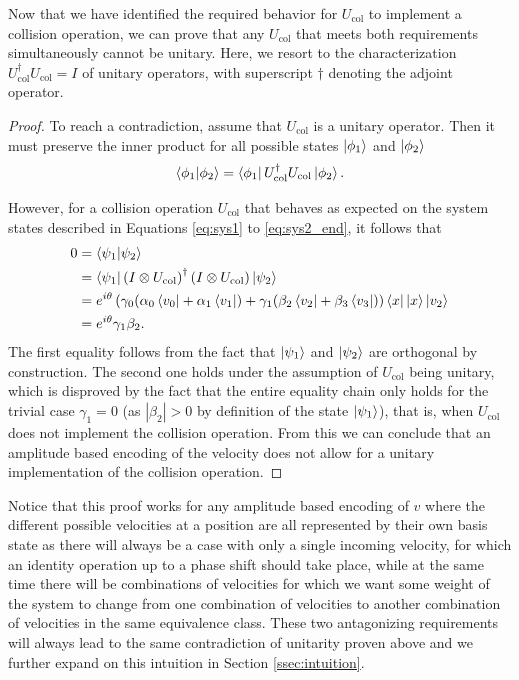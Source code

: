 Now that we have identified the required behavior for $U_\text{col}$ to implement a collision operation, we can prove that any $U_\text{col}$ that meets both requirements simultaneously cannot be unitary. Here, we resort to the characterization $U_\text{col}^\dagger U_\text{col}=I$ of unitary operators, with superscript $\dagger$ denoting the adjoint operator.

\begin{proof}
To reach a contradiction, assume that $U_\text{col}$ is a unitary operator. Then it must preserve the inner product for all possible states $\ket{\phi_1}$ and $\ket{\phi_2}$
\begin{equation}
    \braket{\phi_1 | \phi_2} = \bra{\phi_1} U_\text{col}^\dagger U_\text{col} \ket{\phi_2}.
\end{equation}

However, for a collision operation $U_\text{col}$ that behaves as expected on the system states described in Equations \eqref{eq:sys1} to \eqref{eq:sys2_end}, it follows that
\begin{equation}
\begin{split}
0 &=\braket{\psi_1|\psi_2} \\ & = \bra{\psi_1} \left ( I \otimes U_\text{col} \right )^\dagger \left ( I \otimes U_\text{col} \right ) \ket{\psi_2} \\ & = e^{i\theta}\left ( \gamma_0(\alpha_0\bra{v_0} + \alpha_1\bra{v_1}) + \gamma_1(\beta_2\bra{v_2} + \beta_3\bra{v_3})  \right )  \bra{x} \ket{x}  \ket{v_2}  \\ & = e^{i\theta}\gamma_1\beta_2.
\end{split}
\end{equation}
The first equality follows from the fact that $\ket{\psi_1}$ and $\ket{\psi_2}$ are orthogonal by construction. The second one holds under the assumption of $U_\text{col}$ being unitary, which is disproved by the fact that the entire equality chain only holds for the trivial case $\gamma_1=0$ (as $|\beta_2|>0$ by definition of the state $\ket{\psi_1}$), that is, when $U_\text{col}$ does not implement the collision operation.
From this we can conclude that an amplitude based encoding of the velocity does not allow for a unitary implementation of the collision operation. 
\end{proof}
Notice that this proof works for any amplitude based encoding of $v$ where the different possible velocities at a position are all represented by their own basis state as there will always be a case with only a single incoming velocity, for which an identity operation up to a phase shift should take place, while at the same time there will be combinations of velocities for which we want some weight of the system to change from one combination of velocities to another combination of velocities in the same equivalence class. These two antagonizing requirements will always lead to the same contradiction of unitarity proven above and we further expand on this intuition in Section \ref{ssec:intuition}.


